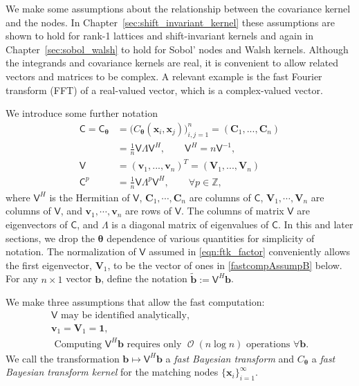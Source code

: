 \documentclass{iitthesis}          %
\DeclareMathOperator{\Order}{{\mathcal O}}
\newcommand{\bm}[1]{\boldsymbol{#1}}
\newcommand{\integers}{\mathbb{Z}}
\newcommand{\vtheta}{{\bm{\theta}}}
\newcommand{\vb}{\bm{b}}
\newcommand{\vC}{\bm{C}}
\newcommand{\vv}{\bm{v}}
\newcommand{\vV}{\bm{V}}
\newcommand{\vx}{\bm{x}}
\newcommand{\vone}{\bm{1}}
\newcommand{\mC}{\mathsf{C}}
\newcommand{\mCtheta}{{\mathsf{C}_{\vtheta}}}
\newcommand{\mLambda}{\mathsf{\Lambda}}
\newcommand{\mV}{\mathsf{V}}
\begin{document}

We make some assumptions about the relationship between the covariance kernel and the nodes. 
In Chapter~\ref{sec:shift_invariant_kernel} these assumptions are shown to hold  for rank-1 lattices and shift-invariant kernels and again in Chapter~\ref{sec:sobol_walsh} to hold for Sobol' nodes and Walsh kernels.  Although the integrands and covariance kernels are real, it is convenient to allow related vectors and matrices to be complex.  A relevant example is the fast Fourier transform (FFT) of a real-valued vector, which is a complex-valued vector.

We introduce some further notation
\begin{align}
\nonumber
\mC = \mCtheta &= \Big(C_\vtheta(\vx_i,\vx_j)\Big)_{i,j=1}^n  = (\vC_1,...,\vC_n) 
\\
\label{eqn:ftk_factor}
&= \frac 1n \mV \mLambda \mV^H , 
\quad \quad \mV^H = n \mV^{-1}, \\
\nonumber
\mV &= (\vv_1,...,\vv_n)^T = (\vV_1,...,\vV_n) \\
\nonumber
\mC^p  &= \frac 1n \mV \mLambda^{p} \mV^H, \qquad \forall p \in \integers,
\end{align}
where $\mV^H$ is the Hermitian of $\mV$, $\vC_1,\cdots,\vC_n$ are columns of $\mC$,  $\vV_1,\cdots,\vV_n$ are columns of $\mV$, and $\vv_1,\cdots,\vv_n$ are rows of $\mV$. 
The columns of matrix $\mV$ are eigenvectors of $\mC$, and $\mLambda$ is a diagonal matrix of eigenvalues of $\mC$.
In this and later sections, we drop the $\vtheta$ dependence of various quantities for simplicity of notation.  The normalization of $\mV$ assumed in \eqref{eqn:ftk_factor} conveniently allows the first eigenvector, $\vV_1$, to be the vector of ones in \eqref{fastcompAssumpB} below.  
For any $n \times 1$ vector $\vb$, define the notation  $\widetilde{\vb} := \mV^H \vb$.

We make three assumptions that allow the fast computation:
\begin{subequations} \label{fastcompAssump}
	\begin{gather}
	\label{fastcompAssumpA}
	\mV \text{ may be identified analytically}, \\
	\label{fastcompAssumpB}
	\vv_1 = \vV_1 = \vone, \\
	\label{fastcompAssumpC}
	\text{ Computing $\mV^H \vb$ requires only $\Order(n \log n)$ operations } \forall \vb.
	\end{gather}
\end{subequations}
We call the transformation $\vb \mapsto \mV^H \vb$ a \emph{fast Bayesian transform} and $C_\vtheta$ a \emph{fast Bayesian transform kernel} for the matching nodes $\{\vx_i\}_{i=1}^\infty$.  
\end{document}
